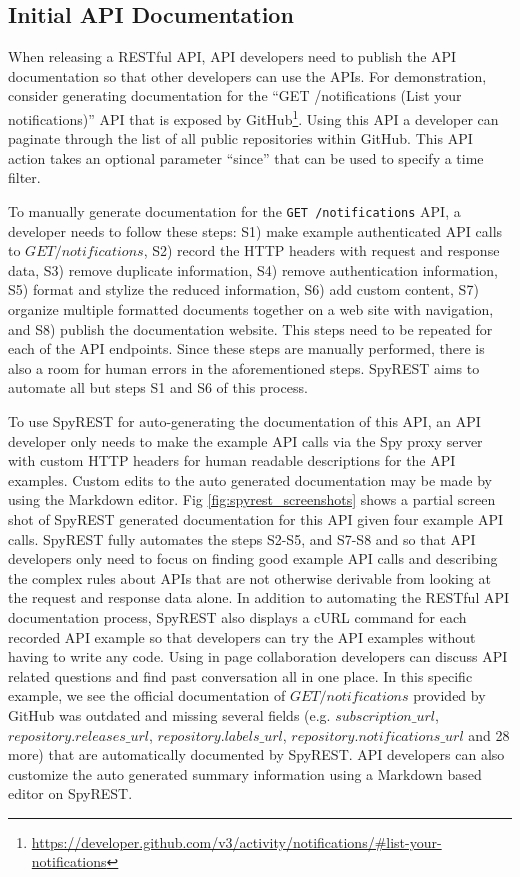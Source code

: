 \documentclass[conference]{IEEEtran}
\begin{document}
\subsection{Initial API Documentation} %
When releasing a RESTful API, API developers need to publish the API documentation so that other developers can use the APIs. For demonstration, consider generating documentation for the ``GET /notifications (List your notifications)'' API that is exposed by GitHub\footnote{\url{https://developer.github.com/v3/activity/notifications/#list-your-notifications}}. Using this API a developer can paginate through the list of all public repositories within GitHub. This API action takes an optional parameter ``since'' that can be used to specify a time filter.

To manually generate documentation for the \texttt{GET /notifications} API, a developer needs to follow these steps: S1) make example authenticated API calls to $GET /notifications$, S2) record the HTTP headers with request and response data, S3) remove duplicate information, S4) remove authentication information, S5) format and stylize the reduced information, S6) add custom content, S7) organize multiple formatted documents together on a web site with navigation, and S8) publish the documentation website. This steps need to be repeated for each of the API endpoints. Since these steps are manually performed, there is also a room for human errors in the aforementioned steps. SpyREST aims to automate all but steps S1 and S6 of this process.

To use SpyREST for auto-generating the documentation of this API, an API developer only needs to make the example API calls via the Spy proxy server with custom HTTP headers for human readable descriptions for the API examples. Custom edits to the auto generated documentation may be made by using the Markdown editor. Fig \ref{fig:spyrest_screenshots} shows a partial screen shot of SpyREST generated documentation for this API given four example API calls. SpyREST fully automates the steps S2-S5, and S7-S8 and so that API developers only need to focus on finding good example API calls and describing the complex rules about APIs that are not otherwise derivable from looking at the request and response data alone. In addition to automating the RESTful API documentation process, SpyREST also displays a cURL command for each recorded API example so that developers can try the API examples without having to write any code. Using in page collaboration developers can discuss API related questions and find past conversation all in one place. In this specific example, we see the official documentation of $GET /notifications$ provided by GitHub was outdated and missing several fields (e.g. $subscription\_url$, $repository.releases\_url$, $repository.labels\_url$, $repository.notifications\_url$ and 28 more) that are automatically documented by SpyREST. API developers can also customize the auto generated summary information using a Markdown based editor on SpyREST.
\end{document}
